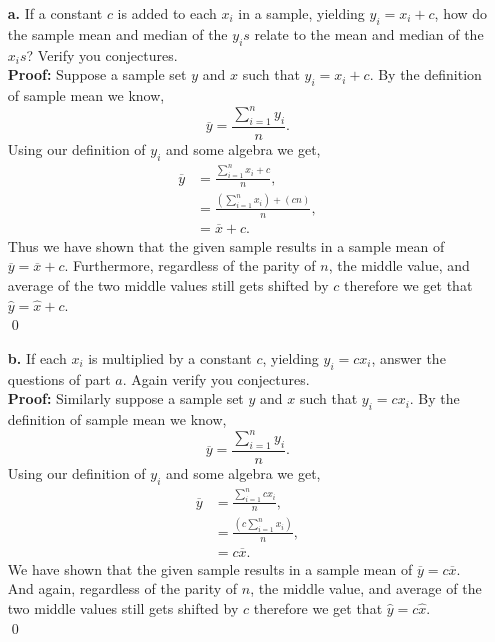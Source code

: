 \documentclass[12pt]{article}
\makeatletter
\theoremstyle{homework}
\newenvironment{exercise}[1]
{\def\@currentlabel{#1}\exercisecore}
{\endexercisecore}
\makeatother
\begin{document}
\begin{exercise}{1.42}                                                                                                               
  \hfill \break
  \begin{enumerate}
  \item[\textbf{a.}] If a constant $c$ is added to each $x_i$ in a sample, yielding $y_i = x_i + c$, how do the sample mean and median of the $y_{i}s$
  relate to the mean and median of the $x_{i}s$? Verify you conjectures. \\
 
  \textbf{Proof:} Suppose a sample set $y$ and $x$ such that $y_i = x_i + c$. By the definition of sample mean we know,
  \begin{equation*}
    \overline{y}= \frac{\sum_{i = 1}^{n} y_i}{n}.
  \end{equation*}
  \vspace{.5in}
  Using our definition of $y_i$ and some algebra we get,
  \begin{align*}
    \overline{y} &= \frac{\sum_{i = 1}^{n} x_i + c}{n},\\
    &= \frac{(\sum_{i = 1}^{n} x_i)+(cn)}{n},\\
    &= \overline{x} + c.
  \end{align*}
  Thus we have shown that the given sample results in a sample mean of $\overline{y} = \overline{x} + c$. Furthermore, regardless of the parity of $n$, the middle value, and average of the two middle values 
  still gets shifted by $c$ therefore we get that $\hat{y} = \hat{x} + c$.\\
  \qed

  \item[\textbf{b.}] If each $x_i$ is multiplied by a constant $c$, yielding $y_i = cx_i$, answer the questions of part $a$. Again verify you conjectures.\\
  
  \textbf{Proof:} Similarly suppose a sample set $y$ and $x$ such that $y_i = cx_i$. By the definition of sample mean we know,
  \begin{equation*}
    \overline{y}= \frac{\sum_{i = 1}^{n} y_i}{n}.
  \end{equation*}
  \vspace{.5in}
  Using our definition of $y_i$ and some algebra we get,
  \begin{align*}
    \overline{y} &= \frac{\sum_{i = 1}^{n} cx_i}{n},\\
    &= \frac{(c\sum_{i = 1}^{n} x_i)}{n},\\
    &= c\overline{x}.
  \end{align*}
  We have shown that the given sample results in a sample mean of $\overline{y} = c\overline{x}$. And again, regardless of the parity of $n$, the middle value, and average of the two middle values 
  still gets shifted by $c$ therefore we get that $\hat{y} = c\hat{x}$.\\
  \qed
\end{enumerate}

\end{exercise}
\vspace{1in}
\end{document}
